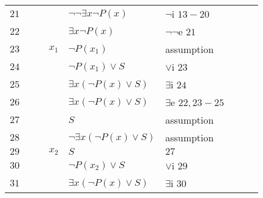 \documentclass[a4paper,12pt]{article}
\begin{document}
\begin{tcolorbox}
\begin{tabular}{l l l l l l l l l}
    $21$  & \multicolumn{1}{|l}{} & & & $\neg \neg \exists x \neg P(x)$ & $\neg$i $13-20$ & & & \multicolumn{1}{l|}{} \\
    
    $22$  & \multicolumn{1}{|l}{} & & & $\exists x \neg P(x)$ & $\neg \neg$e $21$ & & & \multicolumn{1}{l|}{} \\ \cline{3-8}
    
    $23$  & \multicolumn{1}{|l}{} & \multicolumn{1}{|l}{} & $x_1$ & $\neg P(x_1)$ & assumption & & \multicolumn{1}{l|}{} & \multicolumn{1}{l|}{} \\
    
    $24$  & \multicolumn{1}{|l}{} & \multicolumn{1}{|l}{} & & $\neg P(x_1) \vee S$ & $\vee$i $23$ & & \multicolumn{1}{l|}{} & \multicolumn{1}{l|}{} \\
    
    $25$  & \multicolumn{1}{|l}{} & \multicolumn{1}{|l}{} & & $\exists x (\neg P(x) \vee S)$ & $\exists$i $24$ & & \multicolumn{1}{l|}{} & \multicolumn{1}{l|}{} \\ \cline{3-8}
    
    $26$  & \multicolumn{1}{|l}{} & & & $\exists x (\neg P(x) \vee S)$ & $\exists$e $22,23-25$ & & & \multicolumn{1}{l|}{} \\ \cline{2-9} \cline{2-9}
    
    $27$  & \multicolumn{1}{|l}{} & & & $S$ & assumption & & & \multicolumn{1}{l|}{} \\ \cline{3-8}
    
    $28$  & \multicolumn{1}{|l}{} & \multicolumn{1}{|l}{} & & $\neg \exists x (\neg P(x) \vee S)$ & assumption & & \multicolumn{1}{l|}{} & \multicolumn{1}{l|}{} \\ \cline{4-7}
    
    $29$  & \multicolumn{1}{|l}{} & \multicolumn{1}{|l}{} & \multicolumn{1}{|l}{$x_2$} & $S$ & $27$ & \multicolumn{1}{l|}{} & \multicolumn{1}{l|}{} & \multicolumn{1}{l|}{} \\
    
    $30$  & \multicolumn{1}{|l}{} & \multicolumn{1}{|l}{} & \multicolumn{1}{|l}{} & $\neg P(x_2) \vee S$ & $\vee$i $29$ & \multicolumn{1}{l|}{} & \multicolumn{1}{l|}{} & \multicolumn{1}{l|}{} \\
    
    $31$  & \multicolumn{1}{|l}{} & \multicolumn{1}{|l}{} & \multicolumn{1}{|l}{} & $\exists x (\neg P(x) \vee S)$ & $\exists$i $30$ & \multicolumn{1}{l|}{} & \multicolumn{1}{l|}{} & \multicolumn{1}{l|}{} \\
    

\end{tabular}
\end{tcolorbox}
\end{document}
